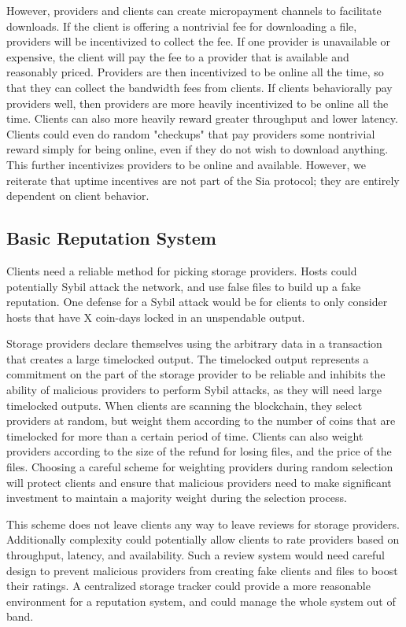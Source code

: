 \documentclass[twocolumn]{article}
\begin{document}
However, providers and clients can create micropayment channels to facilitate downloads.
If the client is offering a nontrivial fee for downloading a file, providers will be incentivized to collect the fee.
If one provider is unavailable or expensive, the client will pay the fee to a provider that is available and reasonably priced.
Providers are then incentivized to be online all the time, so that they can collect the bandwidth fees from clients.
If clients behaviorally pay providers well, then providers are more heavily incentivized to be online all the time.
Clients can also more heavily reward greater throughput and lower latency.
Clients could even do random "checkups" that pay providers some nontrivial reward simply for being online, even if they do not wish to download anything.
This further incentivizes providers to be online and available.
However, we reiterate that uptime incentives are not part of the Sia protocol; they are entirely dependent on client behavior.

\subsection{Basic Reputation System}
Clients need a reliable method for picking storage providers.
Hosts could potentially Sybil attack the network, and use false files to build up a fake reputation.
One defense for a Sybil attack would be for clients to only consider hosts that have X coin-days locked in an unspendable output.

Storage providers declare themselves using the arbitrary data in a transaction that creates a large timelocked output.
The timelocked output represents a commitment on the part of the storage provider to be reliable and inhibits the ability of malicious providers to perform Sybil attacks, as they will need large timelocked outputs.
When clients are scanning the blockchain, they select providers at random, but weight them according to the number of coins that are timelocked for more than a certain period of time.
Clients can also weight providers according to the size of the refund for losing files, and the price of the files.
Choosing a careful scheme for weighting providers during random selection will protect clients and ensure that malicious providers need to make significant investment to maintain a majority weight during the selection process.

This scheme does not leave clients any way to leave reviews for storage providers.
Additionally complexity could potentially allow clients to rate providers based on throughput, latency, and availability.
Such a review system would need careful design to prevent malicious providers from creating fake clients and files to boost their ratings.
A centralized storage tracker could provide a more reasonable environment for a reputation system, and could manage the whole system out of band.
\end{document}
